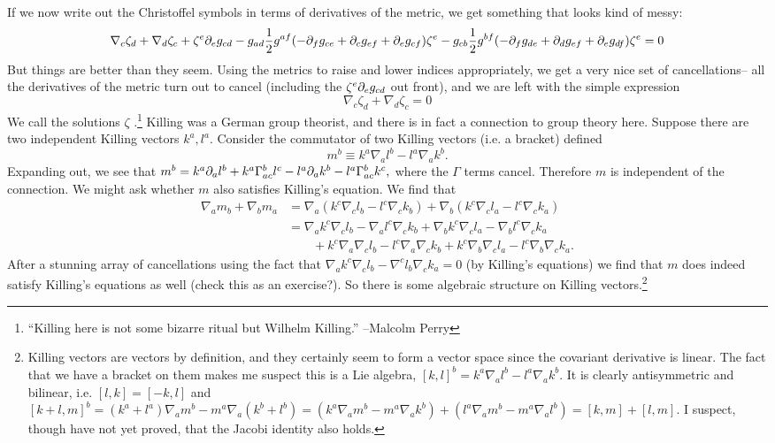 If we now write out the Christoffel symbols in terms of derivatives of the metric, we get something that looks kind of messy:
$$\nabla_c \zeta_d +\nabla_d \zeta_c +\zeta^e \partial_e g_{cd} -g_{ad} \frac{1}{2} g^{af}(-\partial_f g_{ce}+\partial_c g_{ef} +\partial_e g_{cf})\zeta^e - g_{cb}\frac{1}{2} g^{bf}(-\partial_f g_{de}+\partial_d g_{ef}+\partial_e g_{df})\zeta^e=0$$
But things are better than they seem. Using the metrics to raise and lower indices appropriately, we get a very nice set of cancellations-- all the derivatives of the metric turn out to cancel (including the $\zeta^e \partial_e g_{cd}$ out front), and we are left with the simple expression
$$\nabla_c \zeta_d +\nabla_d \zeta_c=0$$
We call the solutions $\zeta$ .\footnote{``Killing here is not some bizarre ritual but Wilhelm Killing.'' --Malcolm Perry} Killing was a German group theorist, and there is in fact a connection to group theory here. Suppose there are two independent Killing vectors $k^a,l^a$. Consider the commutator of two Killing vectors (i.e. a bracket) defined
$$m^b\equiv k^a\nabla_a l^b - l^a \nabla_a k^b.$$
Expanding out, we see that
$m^b=k^a\partial_a l^b+ k^a\Gamma^b_{ac} l^c - l^a \partial_a k^b - l^a \Gamma^b_{ac} k^c,$
where the $\Gamma$ terms cancel. Therefore $m$ is independent of the connection. We might ask whether $m$ also satisfies Killing's equation. We find that
\begin{align*}
\nabla_a m_b +\nabla_b m_a &= \nabla_a (k^c \nabla_c l_b - l^c \nabla_c k_b)+\nabla_b (k^c \nabla_c l_a -l^c \nabla_c k_a)\\
&= \nabla_a k^c \nabla_c l_b -\nabla_a l^c \nabla_c k_b + \nabla_b k^c \nabla_c l_a -\nabla_b l^c \nabla_c k_a\\
&{}\qquad+k^c \nabla_a \nabla_c l_b - l^c \nabla_a \nabla_c k_b +k^c \nabla_b \nabla_c l_a - l^c \nabla_b \nabla_c k_a.
\end{align*}
After a stunning array of cancellations using the fact that $\nabla_a k^c \nabla_c l_b - \nabla^c l_b \nabla_c k_a=0$ (by Killing's equations) we find that $m$ does indeed satisfy Killing's equations as well (check this as an exercise?). So there is some algebraic structure on Killing vectors.\footnote{Killing vectors are vectors by definition, and they certainly seem to form a vector space since the covariant derivative is linear. The fact that we have a bracket on them makes me suspect this is a Lie algebra, $[k,l]^b=k^a\nabla_a l^b - l^a \nabla_a k^b$. It is clearly antisymmetric and bilinear, i.e. $[l,k]=[-k,l]$ and $[k+l,m]^b=(k^a+l^a)\nabla_a m^b -m^a \nabla_a (k^b+l^b)=(k^a \nabla_a m^b - m^a \nabla_a k^b)+(l^a \nabla_a m^b - m^a \nabla_a l^b)=[k,m]+[l,m]$. I suspect, though have not yet proved, that the Jacobi identity also holds.}


